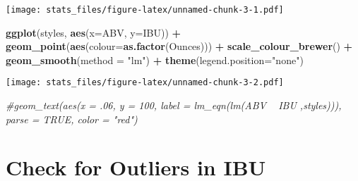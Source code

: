 \documentclass[]{article}
\newenvironment{Shaded}{\begin{snugshade}}{\end{snugshade}}
\newcommand{\KeywordTok}[1]{\textcolor[rgb]{0.13,0.29,0.53}{\textbf{#1}}}
\newcommand{\DataTypeTok}[1]{\textcolor[rgb]{0.13,0.29,0.53}{#1}}
\newcommand{\StringTok}[1]{\textcolor[rgb]{0.31,0.60,0.02}{#1}}
\newcommand{\CommentTok}[1]{\textcolor[rgb]{0.56,0.35,0.01}{\textit{#1}}}
\newcommand{\OperatorTok}[1]{\textcolor[rgb]{0.81,0.36,0.00}{\textbf{#1}}}
\newcommand{\NormalTok}[1]{#1}
\begin{document}
\texttt{[image: stats\_files/figure-latex/unnamed-chunk-3-1.pdf]}

\begin{Shaded}
\begin{Highlighting}[]
\KeywordTok{ggplot}\NormalTok{(styles, }\KeywordTok{aes}\NormalTok{(}\DataTypeTok{x=}\NormalTok{ABV, }\DataTypeTok{y=}\NormalTok{IBU)) }\OperatorTok{+}
\StringTok{  }\KeywordTok{geom_point}\NormalTok{(}\KeywordTok{aes}\NormalTok{(}\DataTypeTok{colour=}\KeywordTok{as.factor}\NormalTok{(Ounces))) }\OperatorTok{+}
\StringTok{  }\KeywordTok{scale_colour_brewer}\NormalTok{() }\OperatorTok{+}
\StringTok{  }\KeywordTok{geom_smooth}\NormalTok{(}\DataTypeTok{method =} \StringTok{"lm"}\NormalTok{) }\OperatorTok{+}
\StringTok{  }\KeywordTok{theme}\NormalTok{(}\DataTypeTok{legend.position=}\StringTok{"none"}\NormalTok{)}
\end{Highlighting}
\end{Shaded}

\texttt{[image: stats\_files/figure-latex/unnamed-chunk-3-2.pdf]}

\begin{Shaded}
\begin{Highlighting}[]
  \CommentTok{#geom_text(aes(x = .06, y = 100, label = lm_eqn(lm(ABV ~ IBU ,styles))), parse = TRUE, color = "red")}
\end{Highlighting}
\end{Shaded}

\section{Check for Outliers in IBU}\label{check-for-outliers-in-ibu}
\end{document}
